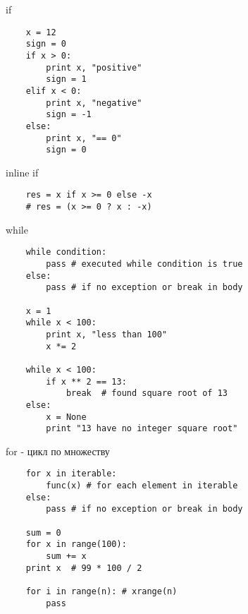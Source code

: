 \documentclass{article}
\begin{document}
\begin{center} if \end{center}
\vspace{15pt}
\begin{lstlisting}
	x = 12
	sign = 0
	if x > 0:
	    print x, "positive"
	    sign = 1
	elif x < 0:
	    print x, "negative"
	    sign = -1
	else:
	    print x, "== 0"
	    sign = 0
\end{lstlisting}
\newpage

\begin{center} inline if \end{center}
\vspace{15pt}
\begin{lstlisting}
	res = x if x >= 0 else -x
	# res = (x >= 0 ? x : -x)
\end{lstlisting}
\newpage

\begin{center} while \end{center}
\vspace{15pt}
\begin{lstlisting}
	while condition:
		pass # executed while condition is true
	else:
		pass # if no exception or break in body

	x = 1
	while x < 100:
		print x, "less than 100"
		x *= 2

	while x < 100:
		if x ** 2 == 13:
			break  # found square root of 13
	else:
		x = None
		print "13 have no integer square root"
\end{lstlisting}
\newpage

\begin{center} for - цикл по множеству \end{center}
\vspace{15pt}
\begin{lstlisting}
	for x in iterable:
		func(x) # for each element in iterable
	else:
		pass # if no exception or break in body

	sum = 0
	for x in range(100):
		sum += x
	print x  # 99 * 100 / 2

	for i in range(n): # xrange(n)
	    pass

\end{lstlisting}
\newpage
\end{document}
